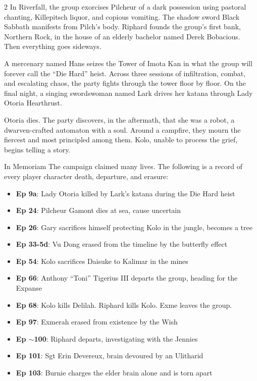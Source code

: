 \begin{multicols}{2}
In Riverfall, the group exorcises Pilcheur of a dark possession using pastoral chanting, Killepitsch liquor, and copious vomiting.  The shadow sword Black Sabbath manifests from Pilch's body.  Riphard founds the group's first bank, Northern Rock, in the house of an elderly bachelor named Derek Bobacious.  Then everything goes sideways.

A mercenary named Hans seizes the Tower of Imota Kan in what the group will forever call the ``Die Hard'' heist.  Across three sessions of infiltration, combat, and escalating chaos, the party fights through the tower floor by floor.  On the final night, a singing swordswoman named Lark drives her katana through Lady Otoria Hearthrust.

Otoria dies.  The party discovers, in the aftermath, that she was a robot, a dwarven-crafted automaton with a soul.  Around a campfire, they mourn the fiercest and most principled among them.  Kolo, unable to process the grief, begins telling a story.

\begin{DndSidebar}{In Memoriam}
The campaign claimed many lives.  The following is a record of every player character death, departure, and erasure:

\begin{itemize}
  \item \textbf{Ep 9a}: Lady Otoria killed by Lark's katana during the Die Hard heist
  \item \textbf{Ep 24}: Pilcheur Gamont dies at sea, cause uncertain
  \item \textbf{Ep 26}: Gary sacrifices himself protecting Kolo in the jungle, becomes a tree
  \item \textbf{Ep 33-5d}: Vu Dong erased from the timeline by the butterfly effect
  \item \textbf{Ep 54}: Kolo sacrifices Daisuke to Kalimar in the mines
  \item \textbf{Ep 66}: Anthony ``Toni'' Tigerius III departs the group, heading for the Expanse
  \item \textbf{Ep 68}: Kolo kills Delilah.  Riphard kills Kolo.  Exme leaves the group.
  \item \textbf{Ep 97}: Exmerah erased from existence by the Wish
  \item \textbf{Ep $\sim$100}: Riphard departs, investigating with the Jennies
  \item \textbf{Ep 101}: Sgt Erin Devereux, brain devoured by an Ulitharid
  \item \textbf{Ep 103}: Burnie charges the elder brain alone and is torn apart
\end{itemize}


\end{DndSidebar}
\end{multicols}
